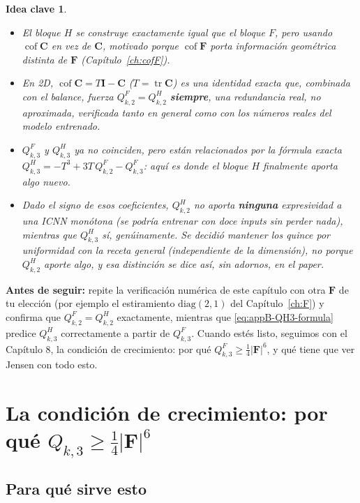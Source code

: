 \documentclass[11pt,a4paper]{article}
\newtheorem{takeaway}{Idea clave}
\newcommand{\Cof}{\operatorname{cof}}
\newcommand{\tr}{\operatorname{tr}}
\begin{document}
\begin{takeaway}
\begin{itemize}
\item El bloque $H$ se construye exactamente igual que el bloque $F$,
pero usando $\Cof\bm C$ en vez de $\bm C$, motivado porque
$\Cof\bm F$ porta informaci\'on geom\'etrica distinta de $\bm F$
(Cap\'itulo~\ref{ch:cofF}).
\item En 2D, $\Cof\bm C=T\bm I-\bm C$ ($T=\tr\bm C$) es una identidad
exacta que, combinada con el balance, fuerza $Q_{k,2}^F=Q_{k,2}^H$
\textbf{siempre}, una redundancia real, no aproximada, verificada
tanto en general como con los n\'umeros reales del modelo entrenado.
\item $Q_{k,3}^F$ y $Q_{k,3}^H$ ya no coinciden, pero est\'an
relacionados por la f\'ormula exacta
$Q_{k,3}^H=-T^3+3T\,Q_{k,2}^F-Q_{k,3}^F$: aqu\'i es donde el bloque
$H$ finalmente aporta algo nuevo.
\item Dado el signo de esos coeficientes, $Q_{k,2}^H$ no aporta
\textbf{ninguna} expresividad a una ICNN mon\'otona (se podr\'ia
entrenar con doce inputs sin perder nada), mientras que $Q_{k,3}^H$
s\'i, gen\'uinamente. Se decidi\'o mantener los quince por uniformidad
con la receta general (independiente de la dimensi\'on), no porque
$Q_{k,2}^H$ aporte algo, y esa distinci\'on se dice as\'i, sin
adornos, en el paper.
\end{itemize}
\end{takeaway}

\bigskip
\noindent\textbf{Antes de seguir:} repite la verificaci\'on num\'erica
de este cap\'itulo con otra $\bm F$ de tu elecci\'on (por ejemplo el
estiramiento $\mathrm{diag}(2,1)$ del Cap\'itulo~\ref{ch:F}) y confirma
que $Q_{k,2}^F=Q_{k,2}^H$ exactamente, mientras que
\eqref{eq:appB-QH3-formula} predice $Q_{k,3}^H$ correctamente a partir
de $Q_{k,3}^F$. Cuando est\'es listo, seguimos con el Cap\'itulo 8, la
condici\'on de crecimiento: por qu\'e $Q_{k,3}^F\geq\tfrac14|\bm F|^6$,
y qu\'e tiene que ver Jensen con todo esto.

\section{La condici\'on de crecimiento: por qu\'e $Q_{k,3}\geq\tfrac14|\bm F|^6$}
\label{ch:growth}

\subsection{Para qu\'e sirve esto}
\end{document}
